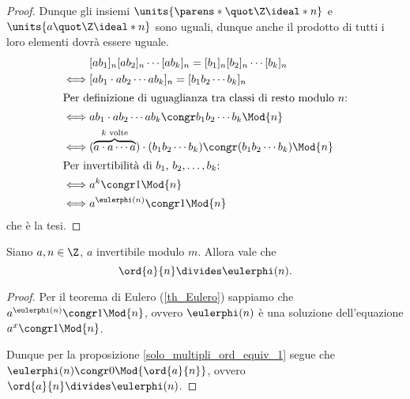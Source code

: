 \begin{proof}
    Dunque gli insiemi $\units{\parens*{\Zmod{n}}}$ e $\units{a\Zmod{n}}$ sono uguali, dunque anche il prodotto di tutti i loro elementi dovrà essere uguale.
    \begin{alignat*}
        {1}
        &[ab_1]_n[ab_2]_n\cdots [ab_k]_n = [b_1]_n[b_2]_n\cdots [b_k]_n\\
        \iff &[ab_1 \cdot ab_2 \cdots ab_k]_n = [b_1b_2\cdots b_k]_n\\
        \intertext{Per definizione di uguaglianza tra classi di resto modulo $n$:}
        \iff &ab_1 \cdot ab_2 \cdots ab_k \congr b_1b_2\cdots b_k \Mod{n} \\
        \iff &(\overbrace{a\cdot a \cdots a}^{k \text{ volte}}) \cdot (b_1b_2\cdots b_k) \congr (b_1b_2\cdots b_k) \Mod{n}\\
        \intertext{Per invertibilità di $b_1$, $b_2, \dots, b_k$:}
        \iff &a^k \congr 1 \Mod{n}\\
        \iff &a^{\eulerphi(n)} \congr 1 \Mod{n}
    \end{alignat*}
    che è la tesi.
\end{proof}

\begin{proposition}
    Siano $a, n \in \Z$, $a$ invertibile modulo $m$. Allora vale che \[
        \ord{a}{n} \divides \eulerphi(n).    
    \]
\end{proposition}
\begin{proof}
    Per il teorema di Eulero (\ref{th_Eulero}) sappiamo che $a^{\eulerphi(n)} \congr 1 \Mod{n}$, ovvero $\eulerphi(n)$ è una soluzione dell'equazione $a^x \congr 1 \Mod{n}$. 
    
    Dunque per la proposizione \ref{solo_multipli_ord_equiv_1} segue che $\eulerphi(n) \congr 0 \Mod{\ord{a}{n}}$, ovvero $\ord{a}{n} \divides \eulerphi(n)$.
\end{proof}